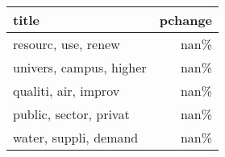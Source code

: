 \begin{tabular}{p{1.2cm}r}
\toprule
                   title &  pchange \\
\midrule
     resourc, use, renew &     nan\% \\
 univers, campus, higher &     nan\% \\
    qualiti, air, improv &     nan\% \\
  public, sector, privat &     nan\% \\
   water, suppli, demand &     nan\% \\
\bottomrule
\end{tabular}
